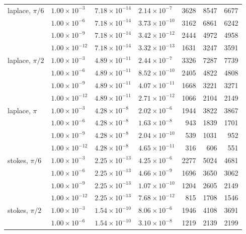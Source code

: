 \documentclass[11pt]{article}
\begin{document}
\begin{table}[H]
\begin{tabular}{@{}llllrrr@{}}
laplace, $\pi/6$ & $1.00\!\times\!10^{-3}$ & $7.18\!\times\!10^{-14}$ & $2.14\!\times\!10^{-7}$ & 3628 & 8547 & 6677 \\
 & $1.00\!\times\!10^{-6}$ & $7.18\!\times\!10^{-14}$ & $3.73\!\times\!10^{-10}$ & 3162 & 6861 & 6242 \\
 & $1.00\!\times\!10^{-9}$ & $7.18\!\times\!10^{-14}$ & $3.42\!\times\!10^{-12}$ & 2444 & 4972 & 4958 \\
 & $1.00\!\times\!10^{-12}$ & $7.18\!\times\!10^{-14}$ & $3.32\!\times\!10^{-13}$ & 1631 & 3247 & 3591 \\
\addlinespace
laplace, $\pi/2$ & $1.00\!\times\!10^{-3}$ & $4.89\!\times\!10^{-11}$ & $2.44\!\times\!10^{-7}$ & 3326 & 7287 & 7739 \\
 & $1.00\!\times\!10^{-6}$ & $4.89\!\times\!10^{-11}$ & $8.52\!\times\!10^{-10}$ & 2405 & 4822 & 4808 \\
 & $1.00\!\times\!10^{-9}$ & $4.89\!\times\!10^{-11}$ & $4.07\!\times\!10^{-11}$ & 1668 & 3221 & 3271 \\
 & $1.00\!\times\!10^{-12}$ & $4.89\!\times\!10^{-11}$ & $2.71\!\times\!10^{-12}$ & 1066 & 2104 & 2149 \\
\addlinespace
laplace, $\pi$ & $1.00\!\times\!10^{-3}$ & $4.28\!\times\!10^{-8}$ & $2.02\!\times\!10^{-6}$ & 1944 & 3822 & 3867 \\
 & $1.00\!\times\!10^{-6}$ & $4.28\!\times\!10^{-8}$ & $1.63\!\times\!10^{-8}$ & 943 & 1839 & 1701 \\
 & $1.00\!\times\!10^{-9}$ & $4.28\!\times\!10^{-8}$ & $2.04\!\times\!10^{-10}$ & 539 & 1031 & 952 \\
 & $1.00\!\times\!10^{-12}$ & $4.28\!\times\!10^{-8}$ & $4.65\!\times\!10^{-11}$ & 316 & 606 & 551 \\
\addlinespace
stokes, $\pi/6$ & $1.00\!\times\!10^{-3}$ & $2.25\!\times\!10^{-13}$ & $4.25\!\times\!10^{-6}$ & 2277 & 5024 & 4681 \\
 & $1.00\!\times\!10^{-6}$ & $2.25\!\times\!10^{-13}$ & $4.66\!\times\!10^{-9}$ & 1696 & 3650 & 3062 \\
 & $1.00\!\times\!10^{-9}$ & $2.25\!\times\!10^{-13}$ & $1.07\!\times\!10^{-10}$ & 1204 & 2605 & 2149 \\
 & $1.00\!\times\!10^{-12}$ & $2.25\!\times\!10^{-13}$ & $7.68\!\times\!10^{-12}$ & 815 & 1708 & 1546 \\
\addlinespace
stokes, $\pi/2$ & $1.00\!\times\!10^{-3}$ & $1.54\!\times\!10^{-10}$ & $8.06\!\times\!10^{-6}$ & 1946 & 4108 & 3691 \\
 & $1.00\!\times\!10^{-6}$ & $1.54\!\times\!10^{-10}$ & $3.10\!\times\!10^{-8}$ & 1219 & 2139 & 2199 \\

\end{tabular}
\end{table}
\end{document}
